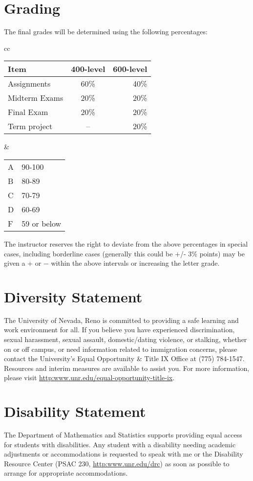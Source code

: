 \documentclass[11pt,onecolumn]{article}
\begin{document}
\section*{Grading}
The final grades will be determined using the following percentages:

\begin{center}
\begin{tabular}{cc}
\begin{tabular}{l|c|r}	%
Item&400-level& 600-level\\\hline\hline
  Assignments&60\% & 40\%\\
  Midterm Exams&20\%& 20\%\\
  Final Exam&20\%& 20\%\\
  Term project &-- &20\%\\
\end{tabular}
&
\begin{tabular}{ll}
A&90-100\\
B&80-89\\
C&70-79\\
D&60-69\\
F&59 or below
\end{tabular}
\end{tabular}
\end{center}

The instructor reserves the right to deviate from the above percentages in special cases, including borderline cases (generally this could be +/- 3\% points) may be given a + or − within the above intervals or increasing the letter grade.

\section*{Diversity Statement}
The University of Nevada, Reno is committed to providing a safe learning and work environment for all. If you believe you have experienced discrimination, sexual harassment, sexual assault, domestic/dating violence, or stalking, whether on or off campus, or need information related to immigration concerns, please contact the University’s Equal Opportunity \& Title IX Office at (775) 784-1547. Resources and interim measures are available to assist you. For more information, please visit \url{http:www.unr.edu/equal-opportunity-title-ix}.

\section*{Disability Statement}
The Department of Mathematics and Statistics supports providing equal access for students with disabilities. Any student with a disability needing academic adjustments or accommodations is requested to speak with me or the Disability Resource Center (PSAC 230, \url{http:www.unr.edu/drc}) as soon as possible to arrange for appropriate accommodations.
\end{document}
